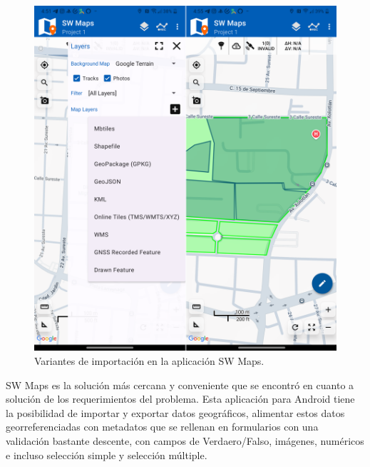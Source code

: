 \begin{figure}[h]
    \centering
    \includegraphics[scale=0.15]{Graphics/sw_maps_importacion.png}
    \caption{Variantes de importación en la aplicación SW Maps.}
    \label{fig:figura8}
\end{figure}

SW Maps es la solución más cercana y conveniente que se encontró en cuanto a solución de los requerimientos del problema. Esta aplicación para Android
tiene la posibilidad de importar y exportar datos geográficos, alimentar estos datos georreferenciadas con metadatos que se rellenan en formularios con una
validación bastante descente, con campos de Verdaero/Falso, imágenes, numéricos e incluso selección simple y selección múltiple.

